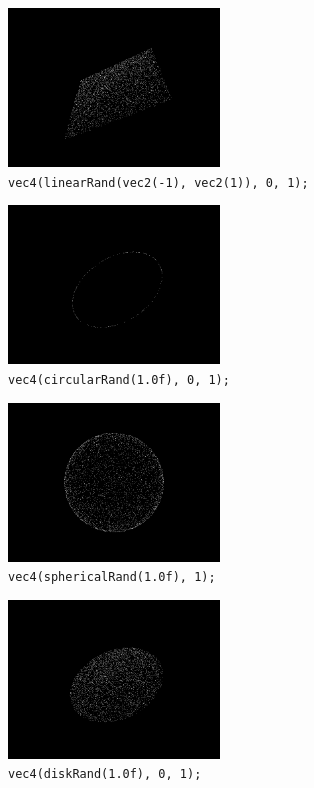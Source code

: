 \documentclass{scrartcl}
\numberwithin{figure}{subsection}
\begin{document}
\begin{figure}[h]
  \centering
  \includegraphics[width=0.5\textwidth]{linearrand}
  \cprotect\caption{\verb|vec4(linearRand(vec2(-1), vec2(1)), 0, 1);|}
\end{figure}

\begin{figure}[h]
  \centering
  \includegraphics[width=0.5\textwidth]{circularrand}
  \cprotect\caption{\verb|vec4(circularRand(1.0f), 0, 1);|}
\end{figure}

\begin{figure}[h]
  \centering
  \includegraphics[width=0.5\textwidth]{sphericalrand}
  \cprotect\caption{\verb|vec4(sphericalRand(1.0f), 1);|}
\end{figure}

\begin{figure}[h]
  \centering
  \includegraphics[width=0.5\textwidth]{diskrand}
  \cprotect\caption{\verb|vec4(diskRand(1.0f), 0, 1);|}
\end{figure}
\end{document}
